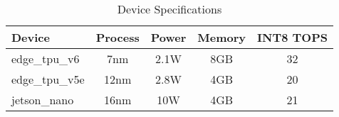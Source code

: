 \begin{table}[htbp]
\centering
\caption{Device Specifications}
\label{tab:device_specs}
\begin{tabular}{lcccc}
\toprule
Device & Process & Power & Memory & INT8 TOPS \\
\midrule
edge\_tpu\_v6 & 7nm & 2.1W & 8GB & 32 \\
edge\_tpu\_v5e & 12nm & 2.8W & 4GB & 20 \\
jetson\_nano & 16nm & 10W & 4GB & 21 \\
\bottomrule
\end{tabular}
\end{table}